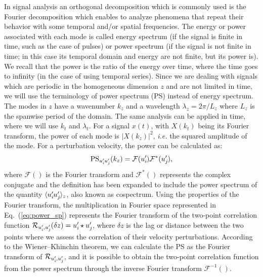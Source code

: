 In signal analysis an orthogonal decomposition which is commonly used is the Fourier decomposition which enables to analyze phenomena that repeat their behavior with some temporal and/or spatial frequencies. The energy or power associated with each mode is called energy spectrum (if the signal is finite in time, such as the case of pulses) or power spectrum (if the signal is not finite in time; in this case its temporal domain and energy are not finite, but its power is). We recall that the power is the ratio of the energy over time, where the time goes to infinity (in the case of using temporal series).
Since we are dealing with signals which are periodic in the homogeneous dimension $z$ and are not limited in time, we will use the terminology of power spectrum (PS) instead of energy spectrum. 
The modes in $z$ have a wavenumber $k_z$ and a wavelength $\lambda_z=2\pi/L_z$ where $L_z$ is the spanwise period of the domain. The same analysis can be applied in time, where we will use $k_t$ and $\lambda_t$.
For a signal $x(t)$, with $X(k_t)$ being its Fourier transform, the power of each mode is $|X(k_z)|^2$, {\it i.e.} the squared amplitude of the mode. For a perturbation velocity, the power can be calculated as:
\begin{equation}
    \mathrm{PS}_{u_i^{\prime}\mkern-1.2mu u_j^{\prime}\mkern-1.2mu}(k_z) = \mathcal{F}(u_i ^{\prime}\mkern-1.2mu)  \mathcal{F}^*(u_j ^{\prime}\mkern-1.2mu),
    \label{eq:power_sp}
\end{equation}
where $\mathcal{F}()$ is the Fourier transform and $\mathcal{F}^*()$ represents the complex conjugate and the definition has been expanded to include the power spectrum of the quantity $\langle u_i^{\prime}\mkern-1.2mu u_j^{\prime}\mkern-1.2mu \rangle_{z}$, also known as cospectrum.
Using the properties of the Fourier transform, the multiplication in Fourier space represented in Eq.~(\ref{eq:power_sp}) represents the Fourier transform of the two-point correlation function $\mathcal{R}_{u_i^{\prime}\mkern-1.2mu, u_j^{\prime}\mkern-1.2mu}(\delta z)=u_i^{\prime}\mkern-1.2mu \star u_j^{\prime}\mkern-1.2mu$, where $\delta z$ is the lag or distance between the two points where we assess the correlation of their velocity perturbations. According to the Wiener--Khinchin theorem, we can calculate the PS as the Fourier transform of $\mathcal{R}_{u_i^{\prime}\mkern-1.2mu, u_j^{\prime}\mkern-1.2mu}$, and it is possible to obtain the two-point correlation function from the power spectrum through the inverse Fourier transform $\mathcal{F}^{-1}()$.

